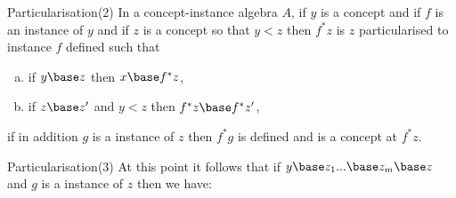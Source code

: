\iffalse
So:
\begin{tabular} {c |p{1cm}| c}
(a) && (b)
\end{tabular}
\fi


\begin{frame}{Particularisation(2)}
In a concept-instance algebra $A$, if $y$ is a concept and if $f$ is an instance of $y$
 and if $z$ is a concept so that $y < z$ then 
 $f^*z$ is $z$  particularised to instance $f$ defined 
      such that 
			\begin{enumerate}[(a)]
			\item if $y \base z$ then $x \base f^*z$,
			\item if $z \base z'$ and $y <z$ then $f^*z \base f^*z'$,
			\end{enumerate}

\medskip
if in addition $g$ is a instance of $z$ then $f^*g$ is defined and is a concept at $f^*z$. 

\end{frame}

\begin{frame}{Particularisation(3)}
At this point it follows that if $y \base z_1 ... \base z_m \base z$ and $g$ is a instance of $z$ then we have:

 

\end{frame}